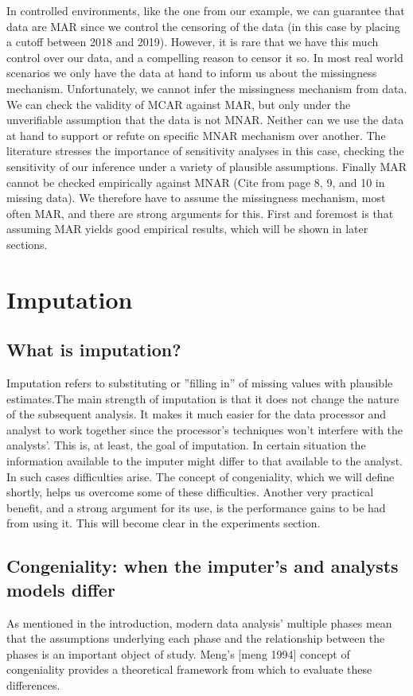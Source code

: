 \documentclass{article}
\begin{document}
	In controlled environments, like the one from our example, we can guarantee that data are MAR since we control the censoring of the data (in this case by placing a cutoff between 2018 and 2019). However, it is rare that we have this much control over our data, and a compelling reason to censor it so. In most real world scenarios we only have the data at hand to inform us about the missingness mechanism. Unfortunately, we cannot infer the missingness mechanism from data.  We can check the validity of MCAR against MAR, but only under the unverifiable assumption that the data is not MNAR. Neither can we use the data at hand to support or refute on specific MNAR mechanism over another. The literature stresses the importance of sensitivity analyses in this case, checking the sensitivity of our inference under a variety of plausible assumptions. Finally MAR cannot be checked empirically against MNAR  (Cite from page 8, 9, and 10 in missing data). We therefore have to assume the missingness mechanism, most often MAR, and there are strong arguments for this. First and foremost is that assuming MAR yields good empirical results, which will be shown in later sections. %
	
	\section{Imputation}
	
	\subsection{What is imputation?}
	Imputation refers to substituting or ''filling in'' of missing values with plausible estimates.The main strength of imputation is that it does not change the nature of the subsequent analysis. It makes it much easier for the data processor and analyst to work together since the processor's techniques won't interfere with the analysts'. This is, at least, the goal of imputation. In certain situation the information available to the imputer might differ to that available to the analyst. In such cases difficulties arise. The concept of congeniality, which we will define shortly, helps us overcome some of these difficulties. Another very practical benefit, and a strong argument for its use, is the performance gains to be had from using it. This will become clear in the experiments section.
	

	\subsection{Congeniality: when the imputer's and analysts models differ}
	As mentioned in the introduction, modern data analysis' multiple phases mean that the assumptions underlying each phase and the relationship between the phases is an important object of study.  Meng's [meng 1994] concept of congeniality provides a theoretical framework from which to evaluate these differences.
	
\end{document}
